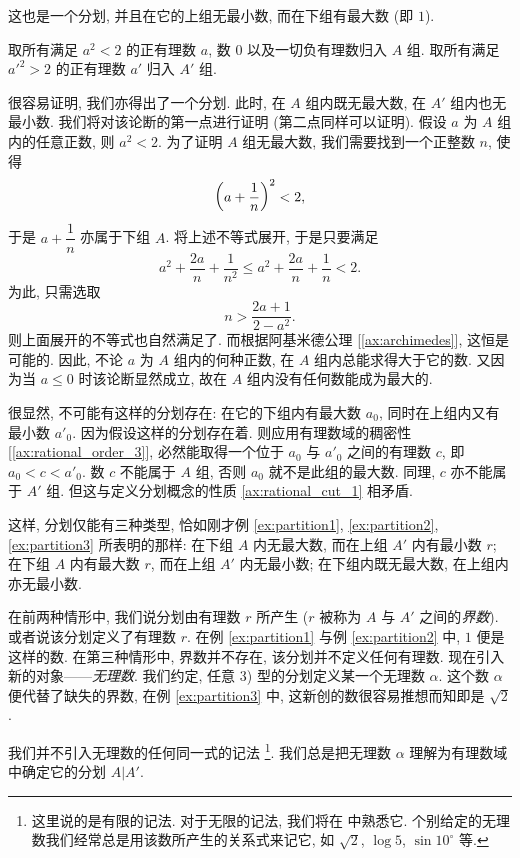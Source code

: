 这也是一个分划, 并且在它的上组无最小数, 而在下组有最大数 (即 $1$).

\begin{example} \label{ex:partition3}
    取所有满足 $a^2 < 2$ 的正有理数 $a$, 数 $0$ 以及一切负有理数归入 $A$ 组.
    取所有满足 $a'^2 > 2$ 的正有理数 $a'$ 归入 $A'$ 组.
\end{example}

很容易证明, 我们亦得出了一个分划.
此时, 在 $A$ 组内既无最大数, 在 $A'$ 组内也无最小数.
我们将对该论断的第一点进行证明 (第二点同样可以证明).
假设 $a$ 为 $A$ 组内的任意正数, 则 $a^2 < 2$.
为了证明 $A$ 组无最大数, 我们需要找到一个正整数 $n$, 使得
$$
\left( a + \dfrac{1}{n} \right)^2 < 2,
$$
于是 $a + \dfrac{1}{n}$ 亦属于下组 $A$.
将上述不等式展开, 于是只要满足
$$
a^2 + \dfrac{2a}{n} + \dfrac{1}{n^2} \leq a^2 + \dfrac{2a}{n} + \frac{1}{n} < 2.
$$
为此, 只需选取
$$
n > \dfrac{2a + 1}{2 - a^2}.
$$
则上面展开的不等式也自然满足了.
而根据阿基米德公理 [\ref{ax:archimedes}], 这恒是可能的.
因此, 不论 $a$ 为 $A$ 组内的何种正数, 在 $A$ 组内总能求得大于它的数.
又因为当 $a \leq 0$ 时该论断显然成立, 故在 $A$ 组内没有任何数能成为最大的.

很显然, 不可能有这样的分划存在: 在它的下组内有最大数 $a_0$, 同时在上组内又有最小数 $a'_0$.
因为假设这样的分划存在着.
则应用有理数域的稠密性 [\ref{ax:rational_order_3}], 必然能取得一个位于 $a_0$ 与 $a'_0$ 之间的有理数 $c$, 即 $a_0 < c < a'_0$.
数 $c$ 不能属于 $A$ 组, 否则 $a_0$ 就不是此组的最大数.
同理, $c$ 亦不能属于 $A'$ 组.
但这与定义分划概念的性质 \ref{ax:rational_cut_1} 相矛盾.

这样, 分划仅能有三种类型, 恰如刚才例 \ref{ex:partition1}, \ref{ex:partition2}, \ref{ex:partition3} 所表明的那样:
{\kaishu
     在下组 $A$ 内无最大数, 而在上组 $A'$ 内有最小数 $r$;
     在下组 $A$ 内有最大数 $r$, 而在上组 $A'$ 内无最小数;
     在下组内既无最大数, 在上组内亦无最小数.
}

在前两种情形中, 我们说分划由有理数 $r$ 所产生 ($r$ 被称为 $A$ 与 $A'$ 之间的\emph{界数}).
或者说该分划定义了有理数 $r$.
在例 \ref{ex:partition1} 与例 \ref{ex:partition2} 中, $1$ 便是这样的数.
在第三种情形中, 界数并不存在, 该分划并不定义任何有理数.
现在引入新的对象——\emph{无理数}.
我们约定, {\kaishu 任意 3) 型的分划定义某一个无理数 $\alpha$}.
这个数 $\alpha$ 便代替了缺失的界数, 在例 \ref{ex:partition3} 中, 这新创的数很容易推想而知即是 $\sqrt{2}$.

我们并不引入无理数的任何同一式的记法
\footnote{这里说的是有限的记法. 对于无限的记法, 我们将在  中熟悉它.
个别给定的无理数我们经常总是用该数所产生的关系式来记它, 如 $\sqrt{2}$, $\log 5$, $\sin 10^\circ$ 等.}.
我们总是把无理数 $\alpha$ 理解为有理数域中确定它的分划 $A|A'$.

